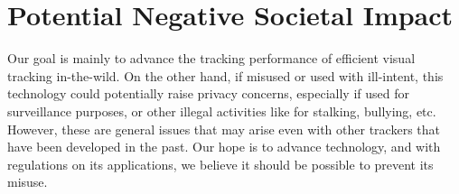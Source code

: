 \chapter{Potential Negative Societal Impact}
\label{Chapter7}
Our goal is mainly to advance the tracking performance of efficient visual tracking in-the-wild. On the other hand, if misused or used with ill-intent, this technology could potentially raise privacy concerns, especially if used for surveillance purposes, or other illegal activities like for stalking, bullying, etc. However, these are general issues that may arise even with other trackers that have been developed in the past. Our hope is to advance technology, and with regulations on its applications, we believe it should be possible to prevent its misuse.